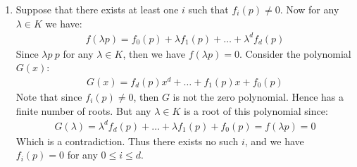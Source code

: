 \begin{enumerate}[label=]
    \item 
        Suppose that there exists at least one $i$ such that $f_i(p) \ne 0$.
        Now for any $\lambda \in K$ we have:
        \begin{gather*}
            f(\lambda p) = f_0(p) + \lambda f_1(p) + \dots + \lambda^d f_d(p)
        \end{gather*}
        Since $\lambda p ~ p$ for any $\lambda \in K$, then we have $f(\lambda p) = 0$. Consider the polynomial $G(x)$:
        \begin{gather*}
            G(x) = f_d(p) x^d + \dots + f_1(p) x + f_0(p)
        \end{gather*}
        Note that since $f_i(p) \ne 0$, then $G$ is not the zero polynomial. Hence has a finite number of roots. But any $\lambda \in K$ is a root of this polynomial since:
        \begin{gather*}
            G(\lambda) = \lambda^d f_d(p) + \dots + \lambda f_1(p) + f_0(p) = f(\lambda p) = 0
        \end{gather*}
        Which is a contradiction. Thus there exists no such $i$, and we have $f_i(p) = 0$ for any $ 0 \le i \le d$.
\end{enumerate}